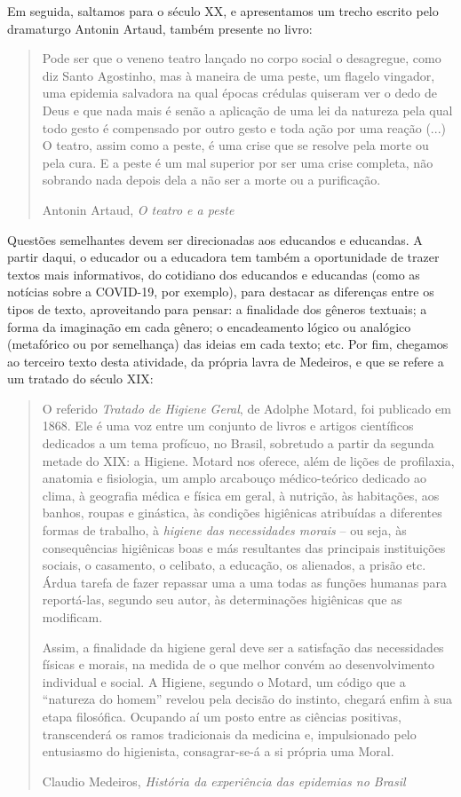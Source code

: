 \documentclass[12pt]{extarticle}
\begin{document}
Em seguida, saltamos para o século XX, e apresentamos um trecho escrito
pelo dramaturgo Antonin Artaud, também presente no livro:

\begin{quote}
Pode ser que o veneno teatro lançado no corpo social o desagregue, como
diz Santo Agostinho, mas à maneira de uma peste, um flagelo vingador,
uma epidemia salvadora na qual épocas crédulas quiseram ver o dedo de
Deus e que nada mais é senão a aplicação de uma lei da natureza pela
qual todo gesto é compensado por outro gesto e toda ação por uma reação
(...) O teatro, assim como a peste, é uma crise que se resolve pela
morte ou pela cura. E a peste é um mal superior por ser uma crise
completa, não sobrando nada depois dela a não ser a morte ou a
purificação.

Antonin Artaud, \emph{O teatro e a peste}
\end{quote}

Questões semelhantes devem ser direcionadas aos educandos e educandas. A
partir daqui, o educador ou a educadora tem também a oportunidade de
trazer textos mais informativos, do cotidiano dos educandos e educandas
(como as notícias sobre a COVID-19, por exemplo), para destacar as
diferenças entre os tipos de texto, aproveitando para pensar: a
finalidade dos gêneros textuais; a forma da imaginação em cada gênero; o
encadeamento lógico ou analógico (metafórico ou por semelhança) das
ideias em cada texto; etc. Por fim, chegamos ao terceiro texto desta
atividade, da própria lavra de Medeiros, e que se refere a um tratado do
século XIX:

\begin{quote}
O referido \emph{Tratado de Higiene Geral}, de Adolphe Motard, foi
publicado em 1868. Ele é uma voz entre um conjunto de livros e artigos
científicos dedicados a um tema profícuo, no Brasil, sobretudo a partir
da segunda metade do XIX: a Higiene. Motard nos oferece, além de lições
de profilaxia, anatomia e fisiologia, um amplo arcabouço médico-teórico
dedicado ao clima, à geografia médica e física em geral, à nutrição, às
habitações, aos banhos, roupas e ginástica, às condições higiênicas
atribuídas a diferentes formas de trabalho, à \emph{higiene das
necessidades morais} -- ou seja, às consequências higiênicas boas e más
resultantes das principais instituições sociais, o casamento, o
celibato, a educação, os alienados, a prisão etc. Árdua tarefa de fazer
repassar uma a uma todas as funções humanas para reportá-las, segundo
seu autor, às determinações higiênicas que as modificam.

Assim, a finalidade da higiene geral deve ser a satisfação das
necessidades físicas e morais, na medida de o que melhor convém ao
desenvolvimento individual e social. A Higiene, segundo o Motard, um
código que a ``natureza do homem'' revelou pela decisão do instinto,
chegará enfim à sua etapa filosófica. Ocupando aí um posto entre as
ciências positivas, transcenderá os ramos tradicionais da medicina e,
impulsionado pelo entusiasmo do higienista, consagrar-se-á a si própria
uma Moral.

Claudio Medeiros, \emph{História da experiência das epidemias no Brasil}
\end{quote}
\end{document}
